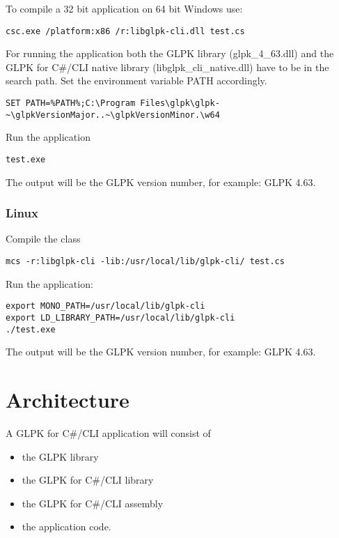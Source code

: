 \documentclass[a4paper,11pt]{report}
\newcommand{\glpkVersionMajor}{4}
\newcommand{\glpkVersionMinor}{63}
\begin{document}
To compile a 32 bit application on 64 bit Windows use:

\begin{lstlisting}
csc.exe /platform:x86 /r:libglpk-cli.dll test.cs
\end{lstlisting}

For running the application both the GLPK library
(glpk\_\glpkVersionMajor\_\glpkVersionMinor.dll) and the GLPK for C\#/CLI
native library (libglpk\_cli\_native.dll) have to be in the search path.
Set the environment variable PATH accordingly.

\begin{lstlisting}
SET PATH=%PATH%;C:\Program Files\glpk\glpk-~\glpkVersionMajor..~\glpkVersionMinor.\w64
\end{lstlisting}

Run the application

\begin{lstlisting}
test.exe
\end{lstlisting}

The output will be the GLPK version number, for example:
GLPK \glpkVersionMajor.\glpkVersionMinor.

\subsection{Linux}
Compile the class

\begin{lstlisting}
mcs -r:libglpk-cli -lib:/usr/local/lib/glpk-cli/ test.cs
\end{lstlisting}

Run the application:

\begin{lstlisting}
export MONO_PATH=/usr/local/lib/glpk-cli
export LD_LIBRARY_PATH=/usr/local/lib/glpk-cli
./test.exe
\end{lstlisting}

The output will be the GLPK version number, for example:
GLPK \glpkVersionMajor.\glpkVersionMinor.

\chapter{Architecture}
A GLPK for C\#/CLI application will consist of
\begin{itemize}
\item the GLPK library
\item the GLPK for C\#/CLI library
\item the GLPK for C\#/CLI assembly
\item the application code.
\end{itemize}
\end{document}
